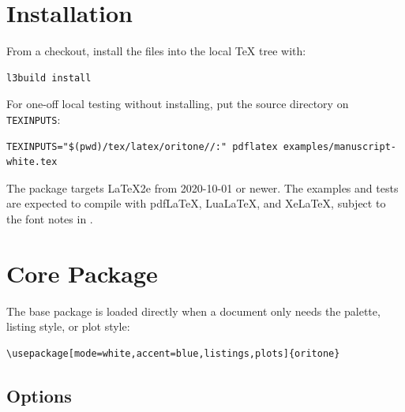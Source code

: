 \documentclass[white,11pt,oneside]{oritone-manuscript}
\begin{document}
\section{Installation}

From a checkout, install the files into the local TeX tree with:

\begin{lstlisting}
l3build install
\end{lstlisting}

For one-off local testing without installing, put the source directory on
\texttt{TEXINPUTS}:

\begin{lstlisting}
TEXINPUTS="$(pwd)/tex/latex/oritone//:" pdflatex examples/manuscript-white.tex
\end{lstlisting}

The package targets LaTeX2e from 2020-10-01 or newer. The examples and tests
are expected to compile with pdfLaTeX, LuaLaTeX, and XeLaTeX, subject to the
font notes in .

\section{Core Package}

The base package is loaded directly when a document only needs the palette,
listing style, or plot style:

\begin{lstlisting}[language={[LaTeX]TeX}]
\usepackage[mode=white,accent=blue,listings,plots]{oritone}
\end{lstlisting}

\subsection{Options}
\end{document}
